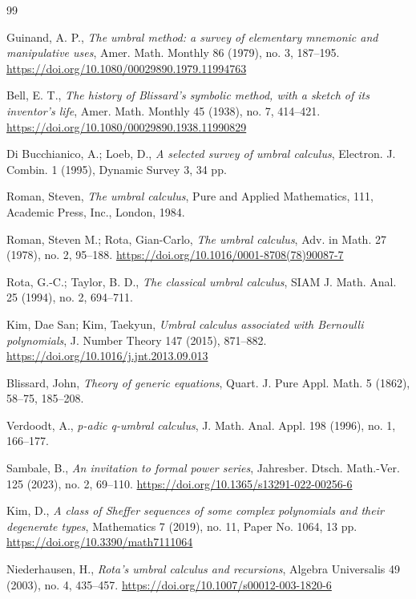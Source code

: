\begin{thebibliography}{99}

Guinand, A. P., 
\textit{The umbral method: a survey of elementary mnemonic and manipulative uses}, 
Amer. Math. Monthly 86 (1979), no. 3, 187–195.
\url{https://doi.org/10.1080/00029890.1979.11994763}

Bell, E. T., \textit{The history of Blissard’s symbolic method, with a sketch of its inventor’s life}, 
Amer. Math. Monthly 45 (1938), no. 7, 414–421.
\url{https://doi.org/10.1080/00029890.1938.11990829}

Di Bucchianico, A.; Loeb, D., 
\textit{A selected survey of umbral calculus}, Electron. J. Combin. 1 (1995), Dynamic Survey 3, 34 pp.

Roman, Steven, \textit{The umbral calculus}, 
Pure and Applied Mathematics, 111, Academic Press, Inc., London, 1984.

Roman, Steven M.; Rota, Gian-Carlo, \textit{The umbral calculus}, 
Adv. in Math. 27 (1978), no. 2, 95–188.
\url{https://doi.org/10.1016/0001-8708(78)90087-7}

Rota, G.-C.; Taylor, B. D., \textit{The classical umbral calculus}, 
SIAM J. Math. Anal. 25 (1994), no. 2, 694–711.

Kim, Dae San; Kim, Taekyun, \textit{Umbral calculus associated with Bernoulli polynomials}, J. Number Theory 147 (2015), 871–882.
\url{https://doi.org/10.1016/j.jnt.2013.09.013}

Blissard, John, \textit{Theory of generic equations}, 
Quart. J. Pure Appl. Math. 5 (1862), 58–75, 185–208.

Verdoodt, A., \textit{p-adic q-umbral calculus}, 
J. Math. Anal. Appl. 198 (1996), no. 1, 166–177.

Sambale, B., \textit{An invitation to formal power series}, 
Jahresber. Dtsch. Math.-Ver. 125 (2023), no. 2, 69–110.
\url{https://doi.org/10.1365/s13291-022-00256-6}

Kim, D., \textit{A class of Sheffer sequences of some complex polynomials and their degenerate types}, Mathematics 7 (2019), no. 11, Paper No. 1064, 13 pp.
\url{https://doi.org/10.3390/math7111064}

Niederhausen, H., \textit{Rota’s umbral calculus and recursions}, 
Algebra Universalis 49 (2003), no. 4, 435–457.
\url{https://doi.org/10.1007/s00012-003-1820-6}


\end{thebibliography}
